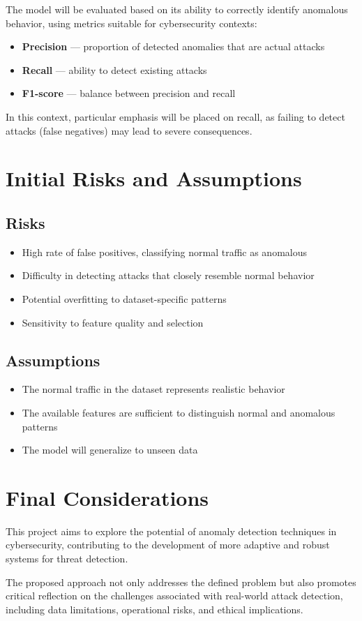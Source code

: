 \documentclass[11pt]{article}
\begin{document}
The model will be evaluated based on its ability to correctly identify anomalous behavior, using metrics suitable for cybersecurity contexts:

\begin{itemize}
    \item \textbf{Precision} — proportion of detected anomalies that are actual attacks
    \item \textbf{Recall} — ability to detect existing attacks
    \item \textbf{F1-score} — balance between precision and recall
\end{itemize}

In this context, particular emphasis will be placed on recall, as failing to detect attacks (false negatives) may lead to severe consequences.

\section{Initial Risks and Assumptions}

\subsection{Risks}

\begin{itemize}
    \item High rate of false positives, classifying normal traffic as anomalous
    \item Difficulty in detecting attacks that closely resemble normal behavior
    \item Potential overfitting to dataset-specific patterns
    \item Sensitivity to feature quality and selection
\end{itemize}

\subsection{Assumptions}

\begin{itemize}
    \item The normal traffic in the dataset represents realistic behavior
    \item The available features are sufficient to distinguish normal and anomalous patterns
    \item The model will generalize to unseen data
\end{itemize}

\section{Final Considerations}

This project aims to explore the potential of anomaly detection techniques in cybersecurity, contributing to the development of more adaptive and robust systems for threat detection.

The proposed approach not only addresses the defined problem but also promotes critical reflection on the challenges associated with real-world attack detection, including data limitations, operational risks, and ethical implications.
\end{document}
